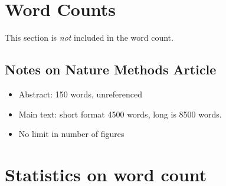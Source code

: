 \section*{Word Counts}
This section is \textit{not} included in the word count.
\subsection*{Notes on Nature Methods Article}
\begin{itemize}
    \item Abstract: 150 words, unreferenced
    \item Main text: short format 4500 words, long is 8500 words.
    \item No limit in number of figures
\end{itemize}

\section*{Statistics on word count}

\immediate{}

